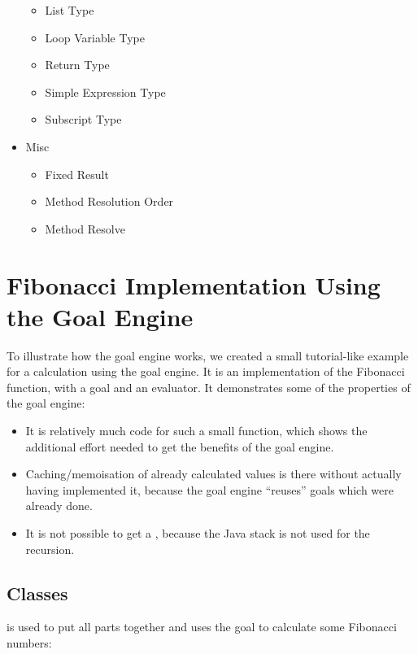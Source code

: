 \documentclass[12pt,halfparskip,DIV11,BCOR10mm]{scrreprt}
\begin{document}
\begin{itemize}
\begin{itemize}
        \item List Type
        \item Loop Variable Type
        \item Return Type
        \item Simple Expression Type
        \item Subscript Type
    \end{itemize}
    \item Misc
    \begin{itemize}
        \item Fixed Result
        \item Method Resolution Order
        \item Method Resolve
    \end{itemize}
\end{itemize}

\section{Fibonacci Implementation Using the Goal Engine}
\label{fibonacci}

To illustrate how the goal engine works, we created a small tutorial-like example for a calculation using the goal engine. It is an implementation of the Fibonacci function, with a goal and an evaluator. It demonstrates some of the properties of the goal engine:

\begin{itemize}
    \item It is relatively much code for such a small function, which shows the additional effort needed to get the benefits of the goal engine.
    \item Caching/memoisation of already calculated values is there without actually having implemented it, because the goal engine ``reuses'' goals which were already done.
    \item It is not possible to get a , because the Java stack is not used for the recursion.
\end{itemize}

\subsection{Classes}

 is used to put all parts together and uses the goal to calculate some Fibonacci numbers:
\end{document}
